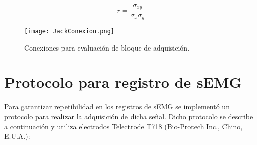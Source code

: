 \vfill
\begin{equation}
	r = \frac{\sigma_{xy}}{\sigma_{x}\sigma_{y}}
	\label{Ecu: CorrePea}
\end{equation}
\vfill

\begin{figure}
	\centering
	\texttt{[image: JackConexion.png]}
	\caption{Conexiones para evaluación de bloque de adquisición.}
	\label{Figura: JackConexion}
\end{figure}

\newpage
\section{Protocolo para registro de sEMG}\label{Sec: ProReg}
Para garantizar repetibilidad en los registros de sEMG se implementó un protocolo para realizar la adquisición de dicha señal. Dicho protocolo se describe a continuación y utiliza electrodos Telectrode T718 (Bio-Protech Inc., Chino, E.U.A.):

